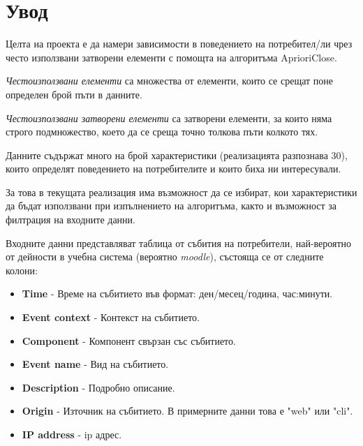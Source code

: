 \documentclass[a4paper, 12pt]{article}
\begin{document}
\section{Увод}
Целта на проекта е да намери зависимости в поведението на потребител/ли чрез често
използвани затворени елементи с помощта на алгоритъма AprioriClose.

\textit{Честоизползвани елементи} са множества от елементи,
които се срещат поне определен брой пъти в данните.

\textit{Честоизползвани затворени елементи} са затворени елементи,
за които няма строго подмножество, което да се среща точно толкова пъти колкото тях.

Данните съдържат много на брой характеристики (реализацията разпознава 30),
които определят поведението на потребителите и които биха ни интересували.

За това в текущата реализация има възможност да се избират,
кои характеристики да бъдат използвани при изпълнението на алгоритъма,
както и възможност за филтрация на входните данни.

Входните данни представляват таблица от събития на потребители,
най-вероятно от дейности в учебна система (вероятно \textit{moodle}),
състояща се от следните колони:
\begin{itemize}
\item \textbf{Time} - Време на събитието във формат: ден/месец/година, час:минути.
\item \textbf{Event context} - Контекст на събитието.
\item \textbf{Component} - Компонент свързан със събитието.
\item \textbf{Event name} - Вид на събитието.
\item \textbf{Description} - Подробно описание.
\item \textbf{Origin} - Източник на събитието. В примерните данни това е "web"  или "cli".
\item \textbf{IP address} - ip адрес.
\end{itemize}
\end{document}
